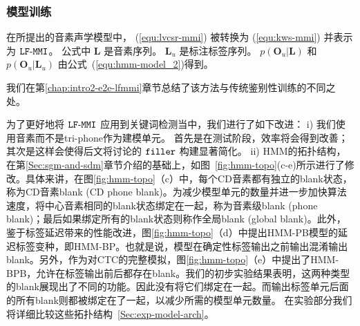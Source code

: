 \subsubsection{模型训练}
\label{Sec:lfmmi-train}

在所提出的音素声学模型中， (\ref{equ:lvcsr-mmi}) 被转换为 (\ref{equ:kws-mmi}) 并表示为 $\tt{LF\text{-}MMI}$。
公式中 $\mathbf{L}$ 是音素序列。 $\mathbf{L}_u$ 是标注标签序列。
$p(\mathbf{O}_u|\mathbf{L})$ 和 $p(\mathbf{O}_u|\mathbf{L}_u)$ 由公式~(\ref{equ:hmm-model_2})得到。 


我们在第\ref{chap:intro2-e2e-lfmmi}章节总结了该方法与传统鉴别性训练的不同之处。



为了更好地将 $\tt{LF\text{-}MMI}$ 应用到关键词检测当中，我们进行了如下改进：
i) 我们使用音素而不是tri-phone作为建模单元。
首先是在测试阶段，效率将会得到改善；其次是这样会使得后文将讨论的 $\tt filler$ 构建显著简化。
ii) HMM的拓扑结构，在第\ref{Sec:sgm-and-sdm}章节介绍的基础上，如图~\ref{fig:hmm-topo}(c-e)所示进行了修改。具体来讲，在图\ref{fig:hmm-topo}（c）中，每个CD音素都有独立的blank状态，称为CD音素blank (CD phone blank)。为减少模型单元的数量并进一步加快算法速度，将中心音素相同的blank状态绑定在一起，称为音素级blank (phone blank)；最后如果绑定所有的blank状态则称作全局blank (global blank)。此外，鉴于标签延迟带来的性能改进\cite{amodei2015deep}，图\ref{fig:hmm-topo}（d）中提出HMM-PB模型的延迟标签变种，即HMM-BP。也就是说，模型在确定性标签输出之前输出混淆输出blank。另外，作为对CTC的完整模拟，图\ref{fig:hmm-topo}（e）中提出了HMM-BPB，允许在标签输出前后都存在blank。我们的初步实验结果表明，这两种类型的blank展现出了不同的功能。因此没有将它们绑定在一起。而输出标签单元后面的所有blank则都被绑定在了一起，以减少所需的模型单元数量。
在实验部分我们将详细比较这些拓扑结构~\ref{Sec:exp-model-arch}。

